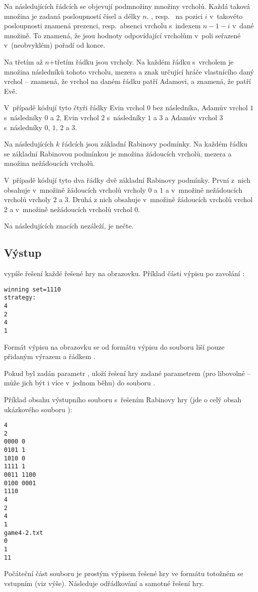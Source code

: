 Na následujících řádcích se objevují podmnožiny množiny vrcholů. Každá taková množina je zadaná posloupností čísel  a  délky $n$. , resp.~ na pozici $i$ v~takovéto posloupnosti znamená prezenci, resp.~absenci vrcholu s~indexem $n - 1 - i$ v~dané množině. To znamená, že jsou hodnoty odpovídající vrcholům v~poli seřazené v~(neobvyklém) pořadí od konce.

Na třetím až $n$+třetím řádku jsou vrcholy. Na každém řádku s~vrcholem je množina následníků tohoto vrcholu, mezera a znak určující hráče vlastnícího daný vrchol --  znamená, že vrchol na daném řádku patří Adamovi, a  znamená, že patří Evě.

V~případě  kódují tyto čtyři řádky Evin vrchol $0$ bez následníka, Adamův vrchol $1$ s~následníky $0$ a $2$, Evin vrchol $2$ s~následníky $1$ a $3$ a Adamův vrchol $3$ s~následníky $0$, $1$, $2$ a $3$.

Na následujících $k$ řádcích jsou základní Rabinovy podmínky. Na každém řádku se základní Rabinovou podmínkou je množina žádoucích vrcholů, mezera a množina nežádoucích vrcholů.

V~případě  kódují tyto dva řádky dvě základní Rabinovy podmínky. První z~nich obsahuje v~množině žádoucích vrcholů vrcholy $0$ a $1$ a v~množině nežádoucích vrcholů vrcholy $2$ a $3$. Druhá z nich obsahuje v~množině žádoucích vrcholů vrchol $2$ a v~množině nežádoucích vrcholů vrchol $0$.

Na následujících znacích nezáleží, \rgsexe{} je nečte.
\subsection{Výstup}
\rgsexe{} vypíše řešení každé řešené hry na obrazovku. Příklad části výpisu po zavolání :
\begin{verbatim}
winning set=1110
strategy:
4
2
4
1
\end{verbatim}
Formát výpisu na obrazovku se od formátu výpisu do souboru liší pouze přidaným výrazem  a řádkem .

Pokud byl zadán parametr , \rgsexe{} uloží řešení hry zadané parametrem  (pro libovolné  -- může jich být i více v~jednom běhu) do souboru .

Příklad obsahu výstupního souboru s~řešením Rabinovy hry (jde o celý obsah ukázkového souboru ):
\begin{verbatim}
4
2
0000 0
0101 1
1010 0
1111 1
0011 1100
0100 0001
1110
4
2
4
1
game4-2.txt
0
1
11
\end{verbatim}
Počáteční část souboru je prostým výpisem řešené hry ve formátu totožném se vstupním (viz výše). Následuje odřádkování a samotné řešení hry.

